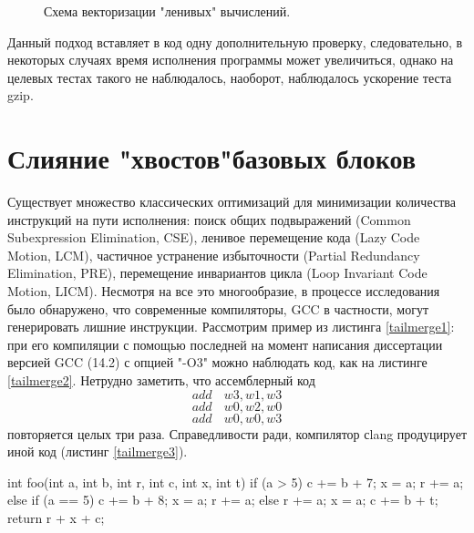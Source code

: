  \begin{figure}[htbp]
 	\centering
 	
 	\caption{Схема векторизации "ленивых"\phantom{ } вычислений.}
 	\label{lcv2}
 \end{figure}
 
 Данный подход вставляет в код одну дополнительную проверку, следовательно, в некоторых случаях время исполнения программы может увеличиться, однако на целевых тестах такого не наблюдалось, наоборот, наблюдалось ускорение теста gzip.
\section{Слияние "хвостов"\phantom{ }базовых блоков} 

Существует множество классических оптимизаций для минимизации количества инструкций на пути исполнения: поиск общих подвыражений (Common Subexpression Elimination, CSE), ленивое перемещение кода (Lazy Code Motion, LCM), частичное устранение избыточности (Partial Redundancy Elimination, PRE), перемещение инвариантов цикла (Loop Invariant Code Motion, LICM). Несмотря на все это многообразие, в процессе исследования было обнаружено, что современные компиляторы, GCC в частности, могут генерировать лишние инструкции. Рассмотрим пример из листинга \ref{tailmerge1}: при его компиляции с помощью последней на момент написания диссертации версией GCC (14.2) с опцией "-O3"\phantom{} можно наблюдать код, как на листинге \ref{tailmerge2}. Нетрудно заметить, что ассемблерный код 
$$add\phantom{ss}w3, w1, w3$$
$$add\phantom{ss}w0, w2, w0$$
$$add\phantom{ss}w0, w0, w3$$
повторяется целых три раза. Справедливости ради, компилятор сlang продуцирует иной код (листинг \ref{tailmerge3}).

 \begin{ListingEnv}[!h]
	\captiondelim{ } %
	\caption{Пример исходного кода для оптимизации слияния "хвостов"\phantom{ }базовых блоков.}\label{tailmerge1}
	
	\begin{Verb}
         int foo(int a, int b, int r, int c, int x, int t)
         {
         	if (a > 5) {
         		c += b + 7;
         		x = a;
         		r += a;
         	} else if (a == 5) {
         		c += b + 8;
         		x = a;
         		r += a;
         	} else {
         		r += a;
         		x = a;
         		c += b + t;
         	}
         	return r + x + c;
         }
	\end{Verb}
\end{ListingEnv}


